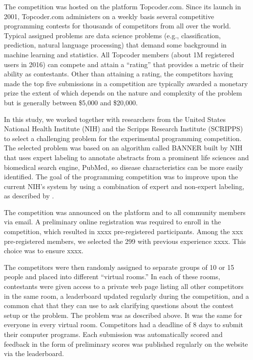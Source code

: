 \documentclass[12pt,]{article}
\begin{document}
The competition was hosted on the platform Topcoder.com. Since its
launch in 2001, Topcoder.com administers on a weekly basis several
competitive programming contests for thousands of competitors from all
over the world. Typical assigned problems are data science problems
(e.g., classification, prediction, natural language processing) that
demand some background in machine learning and statistics. All Topcoder
members (about 1M registered users in 2016) can compete and attain a
``rating'' that provides a metric of their ability as contestants. Other
than attaining a rating, the competitors having made the top five
submissions in a competition are typically awarded a monetary prize the
extent of which depends on the nature and complexity of the problem but
is generally between \$5,000 and \$20,000.

In this study, we worked together with researchers from the United
States National Health Institute (NIH) and the Scripps Research
Institute (SCRIPPS) to select a challenging problem for the experimental
programming competition. The selected problem was based on an algorithm
called BANNER built by NIH \citep{leaman2008banner} that uses expert
labeling to annotate abstracts from a prominent life sciences and
biomedical search engine, PubMed, so disease characteristics can be more
easily identified. The goal of the programming competition was to
improve upon the current NIH's system by using a combination of expert
and non-expert labeling, as described by \citet{good2014microtask}.

The competition was announced on the platform and to all community
members via email. A preliminary online registration was required to
enroll in the competition, which resulted in xxxx pre-registered
participants. Among the xxx pre-registered members, we selected the 299
with previous experience xxxx. This choice was to ensure xxxx.

The competitors were then randomly assigned to separate groups of 10 or
15 people and placed into different ``virtual rooms.'' In each of these
rooms, contestants were given access to a private web page listing all
other competitors in the same room, a leaderboard updated regularly
during the competition, and a common chat that they can use to ask
clarifying questions about the contest setup or the problem. The problem
was as described above. It was the same for everyone in every virtual
room. Competitors had a deadline of 8 days to submit their computer
programs. Each submission was automatically scored and feedback in the
form of preliminary scores was published regularly on the website via
the leaderboard.
\end{document}
